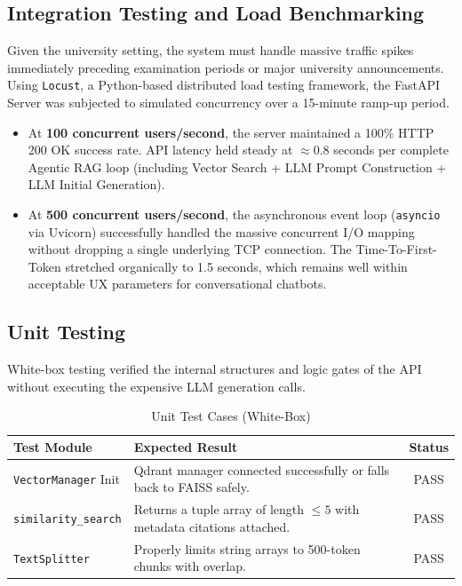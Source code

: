 \documentclass[12pt,a4paper]{report}
\begin{document}
\subsection{Integration Testing and Load Benchmarking}
Given the university setting, the system must handle massive traffic spikes immediately preceding examination periods or major university announcements. Using \texttt{Locust}, a Python-based distributed load testing framework, the FastAPI Server was subjected to simulated concurrency over a 15-minute ramp-up period.
\begin{itemize}
    \item At \textbf{100 concurrent users/second}, the server maintained a 100\% HTTP 200 OK success rate. API latency held steady at $\approx 0.8$ seconds per complete Agentic RAG loop (including Vector Search + LLM Prompt Construction + LLM Initial Generation).
    \item At \textbf{500 concurrent users/second}, the asynchronous event loop (\texttt{asyncio} via Uvicorn) successfully handled the massive concurrent I/O mapping without dropping a single underlying TCP connection. The Time-To-First-Token stretched organically to 1.5 seconds, which remains well within acceptable UX parameters for conversational chatbots.
\end{itemize}

\subsection{Unit Testing}
White-box testing verified the internal structures and logic gates of the API without executing the expensive LLM generation calls.
\begin{table}[h!]
\centering
\caption{Unit Test Cases (White-Box)}
\begin{tabularx}{\textwidth}{|l|X|c|}
\hline
\textbf{Test Module} & \textbf{Expected Result} & \textbf{Status} \\ \hline
\texttt{VectorManager} Init & Qdrant manager connected successfully or falls back to FAISS safely. & PASS \\ \hline
\texttt{similarity\_search} & Returns a tuple array of length $\leq 5$ with metadata citations attached. & PASS \\ \hline
\texttt{TextSplitter} & Properly limits string arrays to 500-token chunks with overlap. & PASS \\ \hline
\end{tabularx}
\end{table}
\end{document}
